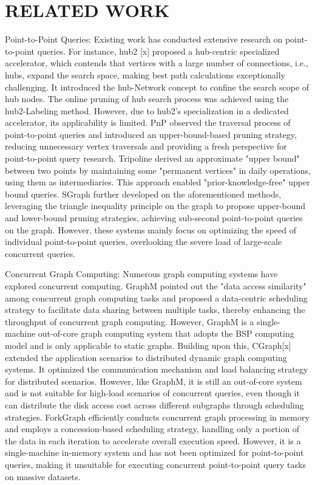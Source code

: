 \documentclass[lettersize,journal]{IEEEtran} %
\begin{document}
\section{RELATED WORK}
Point-to-Point Queries: Existing work has conducted extensive research on point-to-point queries. For instance, hub2 [x] proposed a hub-centric specialized accelerator, which contends that vertices with a large number of connections, i.e., hubs, expand the search space, making best path calculations exceptionally challenging. It introduced the hub-Network concept to confine the search scope of hub nodes. The online pruning of hub search process was achieved using the hub2-Labeling method. However, due to hub2's specialization in a dedicated accelerator, its applicability is limited. PnP observed the traversal process of point-to-point queries and introduced an upper-bound-based pruning strategy, reducing unnecessary vertex traversals and providing a fresh perspective for point-to-point query research. Tripoline derived an approximate "upper bound" between two points by maintaining some "permanent vertices" in daily operations, using them as intermediaries. This approach enabled "prior-knowledge-free" upper bound queries. SGraph further developed on the aforementioned methods, leveraging the triangle inequality principle on the graph to propose upper-bound and lower-bound pruning strategies, achieving sub-second point-to-point queries on the graph. However, these systems mainly focus on optimizing the speed of individual point-to-point queries, overlooking the severe load of large-scale concurrent queries.

Concurrent Graph Computing: Numerous graph computing systems have explored concurrent computing. GraphM pointed out the "data access similarity" among concurrent graph computing tasks and proposed a data-centric scheduling strategy to facilitate data sharing between multiple tasks, thereby enhancing the throughput of concurrent graph computing. However, GraphM is a single-machine out-of-core graph computing system that adopts the BSP computing model and is only applicable to static graphs. Building upon this, CGraph[x] extended the application scenarios to distributed dynamic graph computing systems. It optimized the communication mechanism and load balancing strategy for distributed scenarios. However, like GraphM, it is still an out-of-core system and is not suitable for high-load scenarios of concurrent queries, even though it can distribute the disk access cost across different subgraphs through scheduling strategies. ForkGraph efficiently conducts concurrent graph processing in memory and employs a concession-based scheduling strategy, handling only a portion of the data in each iteration to accelerate overall execution speed. However, it is a single-machine in-memory system and has not been optimized for point-to-point queries, making it unsuitable for executing concurrent point-to-point query tasks on massive datasets.
\end{document}
